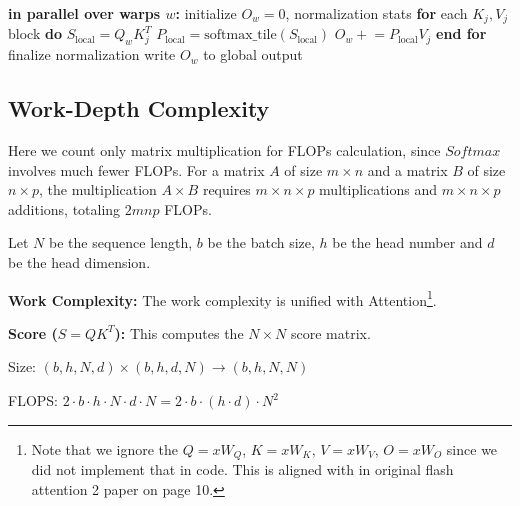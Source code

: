 \documentclass[11pt]{article}
\begin{document}
\begin{algorithm}[htbp]
\caption{FlashAttention-2 (Split-Q, Fully Parallel Warps)}
\label{alg:flashattention2}
\begin{algorithmic}[1]
\STATE \textbf{in parallel over warps $w$:} 
\STATE \hspace{0.5cm} initialize $O_w = 0$, normalization stats
\STATE \hspace{0.5cm} \textbf{for} each $K_j, V_j$ block \textbf{do}
\STATE \hspace{1.0cm} $S_{\text{local}} = Q_w K_j^{T}$
\STATE \hspace{1.0cm} $P_{\text{local}} = \text{softmax\_tile}(S_{\text{local}})$
\STATE \hspace{1.0cm} $O_w \mathrel{+}= P_{\text{local}} V_j$ 
\STATE \hspace{0.5cm} \textbf{end for}
\STATE \hspace{0.5cm} finalize normalization
\STATE \hspace{0.5cm} write $O_w$ to global output
\end{algorithmic}
\end{algorithm}
\subsection{Work-Depth Complexity}

Here we count only matrix multiplication for FLOPs calculation, since $Softmax$ involves much fewer FLOPs. For a matrix $A$ of size $m \times n$ and a matrix $B$ of size $n \times p$,  the multiplication $A \times B$ requires $m \times n \times p$ multiplications and $m \times n \times p$ additions, totaling $2mnp$ FLOPs.

Let $N$ be the sequence length, $b$ be the batch size, $h$ be the head number and $d$ be the head dimension.

\textbf{Work Complexity: } The work complexity is unified with Attention\footnote{Note that we ignore the $Q=xW_Q$, $K=xW_K$, $V=xW_V$, $O=xW_O$ since we did not implement that in code. This is aligned with in original flash attention 2 paper on page 10.}.


\textbf{Score ($S = QK^T$):} This computes the $N \times N$ score matrix.

Size: $(b, h, N, d) \times (b, h, d, N) \rightarrow (b, h, N, N)$

FLOPS: $2 \cdot b \cdot h \cdot N \cdot d \cdot N = 2 \cdot b \cdot (h \cdot d) \cdot N^2$
\end{document}

